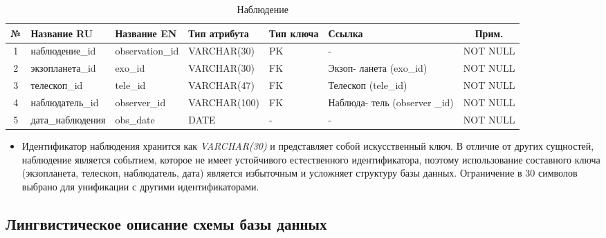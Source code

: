 \documentclass[14pt,a4paper]{extarticle}
\begin{document}
	\begin{table}[H]
    \centering
    \caption{Наблюдение}
    \small
\begin{tabular}{|c|p{3.2cm}|p{2.6cm}|p{2.8cm}|p{1.5cm}|p{1.5cm}|c|}
\hline
№ & Название RU & Название EN & Тип атрибута & Тип ключа & Ссылка & Прим. \\
\hline
1 & наблюдение\_id & observation\_id & VARCHAR(30) & PK & - & NOT NULL \\
2 & экзопланета\_id & exo\_id & VARCHAR(30) & FK & Экзоп- ланета (exo\_id) & NOT NULL \\
3 & телескоп\_id & tele\_id & VARCHAR(47) & FK & Телескоп (tele\_id) & NOT NULL \\
4 & наблюдатель\_id & observer\_id & VARCHAR(100) & FK & Наблюда- тель (observer \_id) & NOT NULL \\
5 & дата\_наблюдения & obs\_date & DATE & - & - & NOT NULL \\
\hline
\end{tabular}
\end{table}

	\begin{itemize}
		\item Идентификатор наблюдения хранится как \textit{VARCHAR(30)} и представляет собой искусственный ключ. В отличие от других сущностей, наблюдение является событием, которое не имеет устойчивого естественного идентификатора, поэтому использование составного ключа (экзопланета, телескоп, наблюдатель, дата) является избыточным и усложняет структуру базы данных. Ограничение в 30 символов выбрано для унификации с другими идентификаторами.
	\end{itemize}

	\newpage

\subsection{Лингвистическое описание схемы базы данных}
\end{document}
